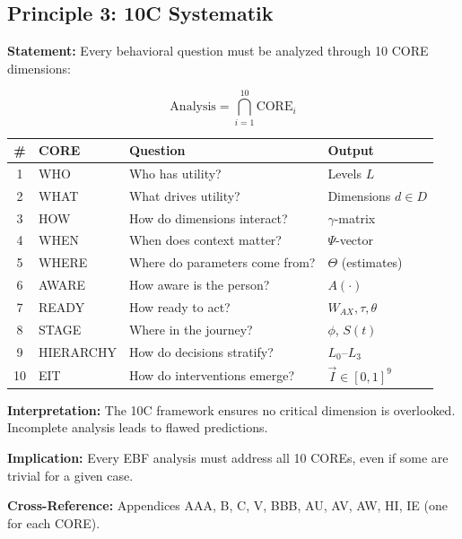 \subsection{Principle 3: 10C Systematik}

\begin{tcolorbox}[colback=gray!5!white, colframe=gray!75!black,
    title=Axiom PR-3: Systematic 10C Analysis]

\textbf{Statement:} Every behavioral question must be analyzed through 10 CORE dimensions:

\begin{equation}
\text{Analysis} = \bigcap_{i=1}^{10} \text{CORE}_i
\end{equation}

\begin{table}[H]
\centering
\renewcommand{\arraystretch}{1.2}
\begin{tabular}{@{}clll@{}}
\toprule
\textbf{\#} & \textbf{CORE} & \textbf{Question} & \textbf{Output} \\
\midrule
1 & WHO & Who has utility? & Levels $L$ \\
2 & WHAT & What drives utility? & Dimensions $d \in D$ \\
3 & HOW & How do dimensions interact? & $\gamma$-matrix \\
4 & WHEN & When does context matter? & $\Psi$-vector \\
5 & WHERE & Where do parameters come from? & $\Theta$ (estimates) \\
6 & AWARE & How aware is the person? & $A(\cdot)$ \\
7 & READY & How ready to act? & $W_{AX}, \tau, \theta$ \\
8 & STAGE & Where in the journey? & $\phi$, $S(t)$ \\
9 & HIERARCHY & How do decisions stratify? & $L_0$--$L_3$ \\
10 & EIT & How do interventions emerge? & $\vec{I} \in [0,1]^9$ \\
\bottomrule
\end{tabular}
\end{table}

\textbf{Interpretation:} The 10C framework ensures no critical dimension is overlooked. Incomplete analysis leads to flawed predictions.

\textbf{Implication:} Every EBF analysis must address all 10 COREs, even if some are trivial for a given case.

\textbf{Cross-Reference:} Appendices AAA, B, C, V, BBB, AU, AV, AW, HI, IE (one for each CORE).

\end{tcolorbox}


